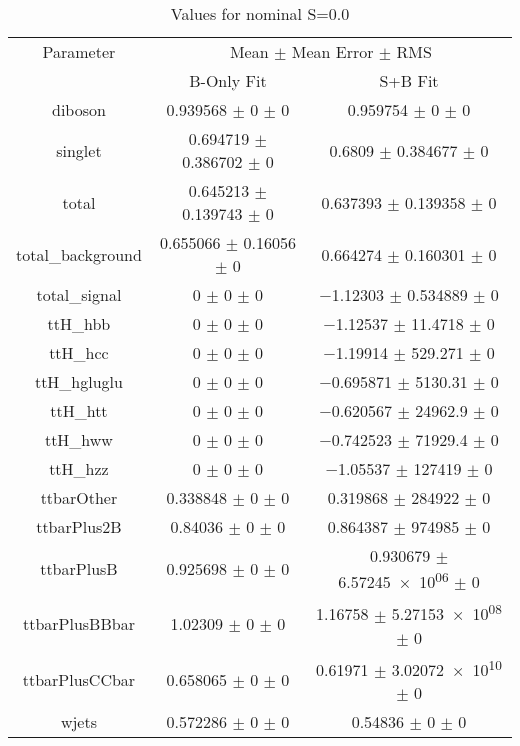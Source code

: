 \begin{table}
\centering
\caption{Values for nominal S=0.0}
\begin{tabular}{ccc}
\toprule
Parameter & \multicolumn{2}{c}{Mean $\pm$ Mean Error $\pm$ RMS}\\
 & B-Only Fit & S+B Fit\\
\midrule
diboson & \num{0.939568} $\pm$ \num{0} $\pm$ \num{0} & \num{0.959754} $\pm$ \num{0} $\pm$ \num{0}\\
singlet & \num{0.694719} $\pm$ \num{0.386702} $\pm$ \num{0} & \num{0.6809} $\pm$ \num{0.384677} $\pm$ \num{0}\\
total & \num{0.645213} $\pm$ \num{0.139743} $\pm$ \num{0} & \num{0.637393} $\pm$ \num{0.139358} $\pm$ \num{0}\\
total\_background & \num{0.655066} $\pm$ \num{0.16056} $\pm$ \num{0} & \num{0.664274} $\pm$ \num{0.160301} $\pm$ \num{0}\\
total\_signal & \num{0} $\pm$ \num{0} $\pm$ \num{0} & \num{-1.12303} $\pm$ \num{0.534889} $\pm$ \num{0}\\
ttH\_hbb & \num{0} $\pm$ \num{0} $\pm$ \num{0} & \num{-1.12537} $\pm$ \num{11.4718} $\pm$ \num{0}\\
ttH\_hcc & \num{0} $\pm$ \num{0} $\pm$ \num{0} & \num{-1.19914} $\pm$ \num{529.271} $\pm$ \num{0}\\
ttH\_hgluglu & \num{0} $\pm$ \num{0} $\pm$ \num{0} & \num{-0.695871} $\pm$ \num{5130.31} $\pm$ \num{0}\\
ttH\_htt & \num{0} $\pm$ \num{0} $\pm$ \num{0} & \num{-0.620567} $\pm$ \num{24962.9} $\pm$ \num{0}\\
ttH\_hww & \num{0} $\pm$ \num{0} $\pm$ \num{0} & \num{-0.742523} $\pm$ \num{71929.4} $\pm$ \num{0}\\
ttH\_hzz & \num{0} $\pm$ \num{0} $\pm$ \num{0} & \num{-1.05537} $\pm$ \num{127419} $\pm$ \num{0}\\
ttbarOther & \num{0.338848} $\pm$ \num{0} $\pm$ \num{0} & \num{0.319868} $\pm$ \num{284922} $\pm$ \num{0}\\
ttbarPlus2B & \num{0.84036} $\pm$ \num{0} $\pm$ \num{0} & \num{0.864387} $\pm$ \num{974985} $\pm$ \num{0}\\
ttbarPlusB & \num{0.925698} $\pm$ \num{0} $\pm$ \num{0} & \num{0.930679} $\pm$ \num{6.57245e+06} $\pm$ \num{0}\\
ttbarPlusBBbar & \num{1.02309} $\pm$ \num{0} $\pm$ \num{0} & \num{1.16758} $\pm$ \num{5.27153e+08} $\pm$ \num{0}\\
ttbarPlusCCbar & \num{0.658065} $\pm$ \num{0} $\pm$ \num{0} & \num{0.61971} $\pm$ \num{3.02072e+10} $\pm$ \num{0}\\
wjets & \num{0.572286} $\pm$ \num{0} $\pm$ \num{0} & \num{0.54836} $\pm$ \num{0} $\pm$ \num{0}\\
\bottomrule
\end{tabular}
\end{table}